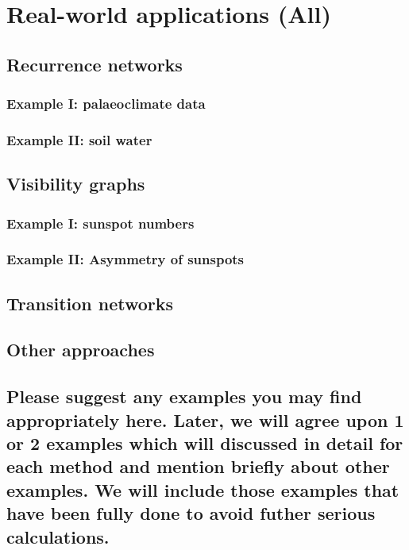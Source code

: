 \section{Real-world applications {\bf{(All)}}}
	\subsection{Recurrence networks}
		\subsubsection{Example I: palaeoclimate data}
		\subsubsection{Example II: soil water }

	\subsection{Visibility graphs}
		\subsubsection{Example I: sunspot numbers}
		\subsubsection{Example II: Asymmetry of sunspots}

	\subsection{Transition networks}
	\subsection{Other approaches}

	\subsection{{\color{red} Please suggest any examples you may find
	appropriately here. Later, we will agree upon 1 or 2 examples which will
	discussed in detail for each method and mention briefly about other examples.
	We will include those examples that have been fully done to avoid futher
	serious calculations. } }
